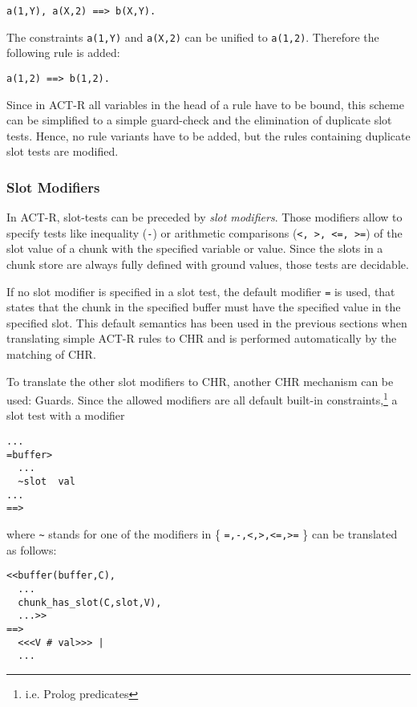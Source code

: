 \begin{lstlisting}
a(1,Y), a(X,2) ==> b(X,Y).
\end{lstlisting}

The constraints \lstinline|a(1,Y)| and \lstinline|a(X,2)| can be unified to \lstinline|a(1,2)|. Therefore the following rule is added:

\begin{lstlisting}
a(1,2) ==> b(1,2).
\end{lstlisting}

Since in ACT-R all variables in the head of a rule have to be bound, this scheme can be simplified to a simple guard-check and the elimination of duplicate slot tests. Hence, no rule variants have to be added, but the rules containing duplicate slot tests are modified.

\subsubsection{Slot Modifiers}
\label{slot_modifiers}

In ACT-R, slot-tests can be preceded by \emph{slot modifiers}. Those modifiers allow to specify tests like inequality (\lstinline|-|) or arithmetic comparisons (\lstinline|<, >, <=, >=|) of the slot value of a chunk with the specified variable or value. Since the slots in a chunk store are always fully defined with ground values, those tests are decidable.

If no slot modifier is specified in a slot test, the default modifier \lstinline|=| is used, that states that the chunk in the specified buffer must have the specified value in the specified slot. This default semantics has been used in the previous sections when translating simple ACT-R rules to CHR and is performed automatically by the matching of CHR.

To translate the other slot modifiers to CHR, another CHR mechanism can be used: Guards. Since the allowed modifiers are all default built-in constraints,\footnote{i.e. Prolog predicates} a slot test with a modifier

\begin{lstlisting}
...
=buffer>
  ...
  ~slot  val
...
==>
\end{lstlisting}

where \lstinline|~| stands for one of the modifiers in \{ \lstinline|=,-,<,>,<=,>=| \} can be translated as follows:

\begin{lstlisting}
<<buffer(buffer,C),
  ...
  chunk_has_slot(C,slot,V),
  ...>>
==>
  <<<V # val>>> |
  ...
\end{lstlisting}

